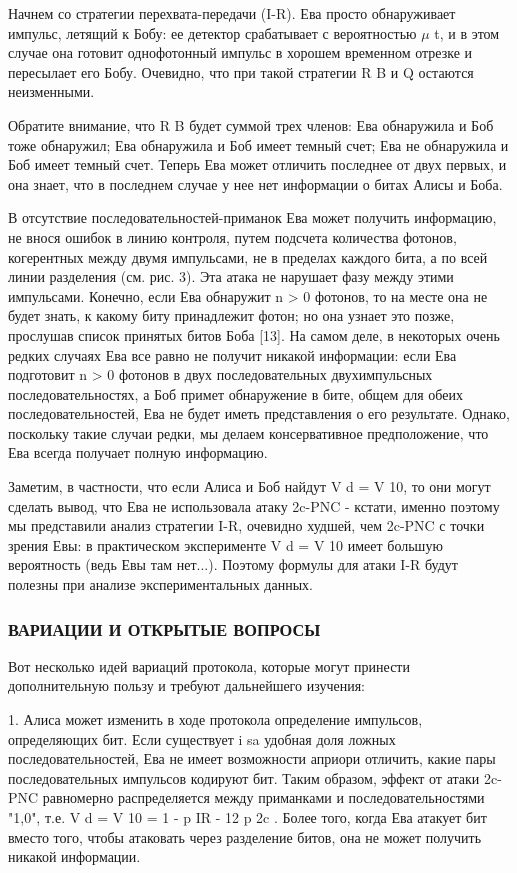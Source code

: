 Начнем со стратегии перехвата-передачи (I-R). Ева просто обнаруживает импульс, летящий к Бобу: ее детектор срабатывает с вероятностью $\mu$ t, и в этом случае она готовит однофотонный импульс в хорошем временном отрезке и пересылает его Бобу. Очевидно, что при такой стратегии R B и Q остаются неизменными.

Обратите внимание, что R B будет суммой трех членов: Ева обнаружила и Боб тоже обнаружил; Ева обнаружила и Боб имеет темный счет; Ева не обнаружила и Боб имеет темный счет. Теперь Ева может отличить последнее от двух первых, и она знает, что в последнем случае у нее нет информации о битах Алисы и Боба.

В отсутствие последовательностей-приманок Ева может получить информацию, не внося ошибок в линию контроля, путем подсчета количества фотонов, когерентных между двумя импульсами, не в пределах каждого бита, а по всей линии разделения (см. рис. 3). Эта атака не нарушает фазу между этими импульсами. Конечно, если Ева обнаружит n > 0 фотонов, то на месте она не будет знать, к какому биту принадлежит фотон; но она узнает это позже, прослушав список принятых битов Боба [13]. На самом деле, в некоторых очень редких случаях Ева все равно не получит никакой информации: если Ева подготовит n > 0 фотонов в двух последовательных двухимпульсных последовательностях, а Боб примет обнаружение в бите, общем для обеих последовательностей, Ева не будет иметь представления о его результате. Однако, поскольку такие случаи редки, мы делаем консервативное предположение, что Ева всегда получает полную информацию.

Заметим, в частности, что если Алиса и Боб найдут V d = V 10, то они могут сделать вывод, что Ева не использовала атаку 2c-PNC - кстати, именно поэтому мы представили анализ стратегии I-R, очевидно худшей, чем 2c-PNC с точки зрения Евы: в практическом эксперименте V d = V 10 имеет большую вероятность (ведь Евы там нет...). Поэтому формулы для атаки I-R будут полезны при анализе экспериментальных данных.

\subsubsection{ВАРИАЦИИ И ОТКРЫТЫЕ ВОПРОСЫ}

Вот несколько идей вариаций протокола, которые могут принести дополнительную пользу и требуют дальнейшего изучения:

1. Алиса может изменить в ходе протокола определение импульсов, определяющих бит. Если существует i sa удобная доля ложных последовательностей, Ева не имеет возможности априори отличить, какие пары последовательных импульсов кодируют бит. Таким образом, эффект от атаки 2c-PNC равномерно распределяется между приманками и последовательностями "1,0", т.е. V d = V 10 = 1 - p IR - 12 p 2c . Более того, когда Ева атакует бит вместо того, чтобы атаковать через разделение битов, она не может получить никакой информации.

